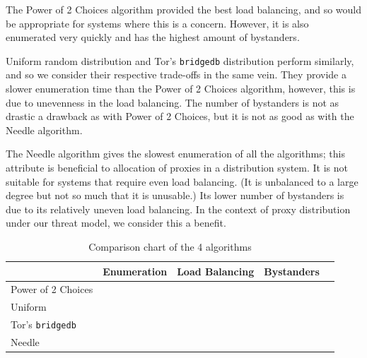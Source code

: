 The Power of 2 Choices algorithm provided the best load balancing, and so would be appropriate for systems where this is a concern. However, it is also enumerated very quickly and has the highest amount of bystanders.

Uniform random distribution and Tor's \texttt{bridgedb} distribution perform similarly, and so we consider their respective trade-offs in the same vein. They provide a slower enumeration time than the Power of 2 Choices algorithm, however, this is due to unevenness in the load balancing. The number of bystanders is not as drastic a drawback as with Power of 2 Choices, but it is not as good as with the Needle algorithm. 

The Needle algorithm gives the slowest enumeration of all the algorithms; this attribute is beneficial to allocation of proxies in a distribution system. It is not suitable for systems that require even load balancing. (It is unbalanced to a large degree but not so much that it is unusable.) Its lower number of bystanders is due to its relatively uneven load balancing. In the context of proxy distribution under our threat model, we consider this a benefit.

\begin{table}[t]
\begin{tabular}{l*{3}{|c}r}
             & Enumeration & Load Balancing & Bystanders \\
\hline
\hline
Power of 2 Choices &   &  &  \\
Uniform            &   &  &   \\
Tor's \texttt{bridgedb} &   &  &   \\
Needle           &   &   &   \\
\end{tabular}
\caption{Comparison chart of the 4 algorithms\label{tab:tradeoff} }
\end{table}